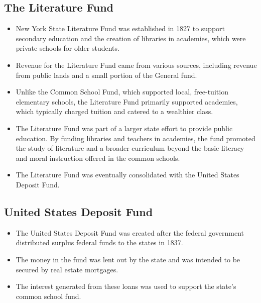 \documentclass[11pt]{article}
\begin{document}
\subsection{The Literature Fund}

\begin{itemize}

\item New York State Literature Fund was established in 1827 to support secondary education 
and the creation of libraries in academies, which were private schools for older students. 

\item Revenue for the Literature Fund came from various sources, including revenue from public lands 
and a small portion of the General fund.
    
\item Unlike the Common School Fund, which supported local, free-tuition elementary schools, 
the Literature Fund primarily supported 
academies, which typically charged tuition and catered to a wealthier class.

\item The Literature Fund was part of a larger state effort to provide public 
education. By funding libraries and teachers in academies, the fund promoted 
the study of literature and a broader curriculum beyond the basic literacy 
and moral instruction offered in the common schools. 
   
\item The Literature Fund was eventually consolidated with the United States Deposit Fund. 

\end{itemize}


\subsection{United States Deposit Fund} 


\begin{itemize} 

\item The United States Deposit Fund was created after the federal government distributed surplus federal funds to the states in 1837. 

\item The money in the fund was lent out by the state and was intended to be secured by real estate mortgages.

\item The interest generated from these loans was used to support the state's common school fund.

\end{itemize}
\end{document}
